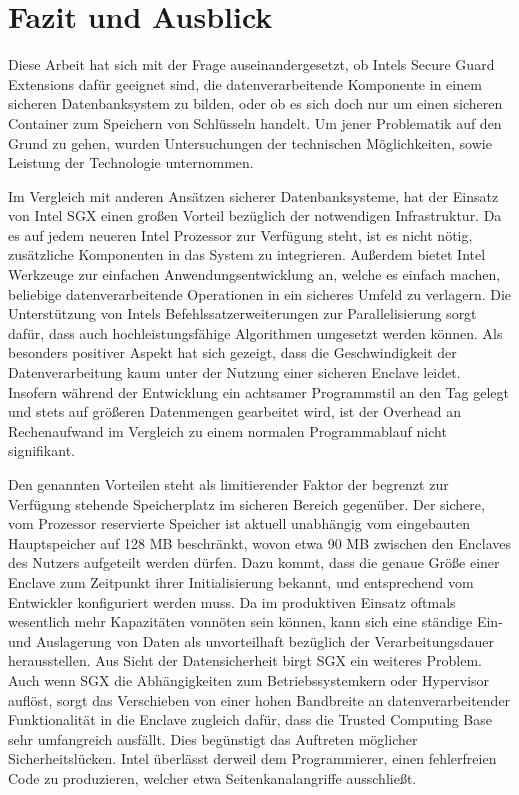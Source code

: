 
\chapter{Fazit und Ausblick}

Diese Arbeit hat sich mit der Frage auseinandergesetzt, ob Intels Secure Guard Extensions dafür geeignet sind, die datenverarbeitende Komponente in einem sicheren Datenbanksystem zu bilden, oder ob es sich doch nur um einen sicheren Container zum Speichern von Schlüsseln handelt. Um jener Problematik auf den Grund zu gehen, wurden Untersuchungen der technischen Möglichkeiten, sowie  Leistung der Technologie unternommen.

Im Vergleich mit anderen Ansätzen sicherer Datenbanksysteme, hat der Einsatz von Intel SGX einen großen Vorteil bezüglich der notwendigen Infrastruktur. Da es auf jedem neueren Intel Prozessor zur Verfügung steht, ist es nicht nötig, zusätzliche Komponenten in das System zu integrieren. Außerdem bietet Intel Werkzeuge zur einfachen Anwendungsentwicklung an, welche es einfach machen, beliebige datenverarbeitende Operationen in ein sicheres Umfeld zu verlagern. Die Unterstützung von Intels Befehlssatzerweiterungen zur Parallelisierung sorgt dafür, dass auch hochleistungsfähige Algorithmen umgesetzt werden können. Als besonders positiver Aspekt hat sich gezeigt, dass die Geschwindigkeit der Datenverarbeitung kaum unter der Nutzung einer sicheren Enclave leidet. Insofern während der Entwicklung ein achtsamer Programmstil an den Tag gelegt und stets auf größeren Datenmengen gearbeitet wird, ist der Overhead an Rechenaufwand im Vergleich zu einem normalen Programmablauf nicht signifikant. 

Den genannten Vorteilen steht als limitierender Faktor der begrenzt zur Verfügung stehende Speicherplatz im sicheren Bereich gegenüber. Der sichere, vom Prozessor reservierte Speicher ist aktuell unabhängig vom eingebauten Hauptspeicher auf 128 MB beschränkt, wovon etwa 90 MB zwischen den Enclaves des Nutzers aufgeteilt werden dürfen. Dazu kommt, dass die genaue Größe einer Enclave zum Zeitpunkt ihrer Initialisierung bekannt, und entsprechend vom Entwickler konfiguriert werden muss. Da im produktiven Einsatz oftmals wesentlich mehr Kapazitäten vonnöten sein können, kann sich eine ständige Ein- und Auslagerung von Daten als unvorteilhaft bezüglich der Verarbeitungsdauer herausstellen. Aus Sicht der Datensicherheit birgt SGX ein weiteres Problem. Auch wenn SGX die Abhängigkeiten zum Betriebssystemkern oder Hypervisor auflöst, sorgt das Verschieben von einer hohen Bandbreite an datenverarbeitender Funktionalität in die Enclave zugleich dafür, dass die Trusted Computing Base sehr umfangreich ausfällt. Dies begünstigt das Auftreten möglicher Sicherheitslücken. Intel überlässt derweil dem Programmierer, einen fehlerfreien Code zu produzieren, welcher etwa Seitenkanalangriffe ausschließt.

